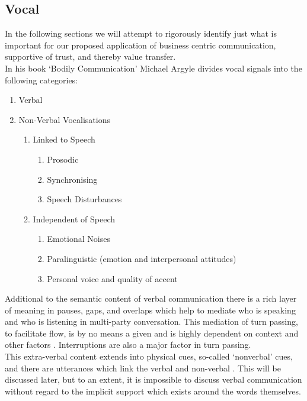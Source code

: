 \subsection{Vocal}
In the following sections we will attempt to rigorously identify just what is important for our proposed application of business centric communication, supportive of trust, and thereby value transfer.\\
In his book `Bodily Communication' \cite{Argyle1988} Michael Argyle divides vocal signals into the following categories:
\begin{enumerate}
\item Verbal
\item Non-Verbal Vocalisations
\begin{enumerate}
       \item Linked to Speech
       \begin{enumerate}
         \item   Prosodic
         \item   Synchronising
         \item   Speech Disturbances
         \end{enumerate}
      \item  Independent of Speech
      \begin{enumerate}
        \item    Emotional Noises
         \item   Paralinguistic (emotion and interpersonal attitudes)
         \item   Personal voice and quality of accent
         \end{enumerate}
\end{enumerate}
\end{enumerate}               
Additional to the semantic content of verbal communication there is a rich layer of meaning in pauses, gaps, and overlaps \cite{Heldner2010} which help to mediate who is speaking and who is listening in multi-party conversation. This mediation of turn passing, to facilitate flow, is by no means a given and is highly dependent on context and other factors \cite{Kleinke1986}. Interruptions are also a major factor in turn passing.\\
This extra-verbal content \cite{Ting-Toomey2012} extends into physical cues, so-called `nonverbal' cues, and there are utterances which link the verbal and non-verbal \cite{Otsuka2005}. This will be discussed later, but to an extent, it is impossible to discuss verbal communication without regard to the implicit support which exists around the words themselves.\\
